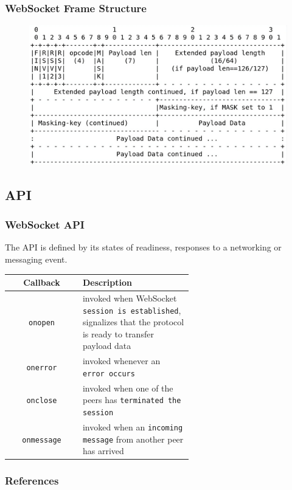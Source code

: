 \documentclass{beamer}
\begin{document}
\begin{frame}
    \frametitle{WebSocket Frame Structure}
    \begin{figure}
        \includegraphics[width=1\textwidth]{images/message_frame.png}
    \end{figure}
\end{frame}

\subsection{API}
\begin{frame}
    \frametitle{WebSocket API}
    The API is defined by its states of readiness, responses to a networking or messaging \alert{event}.
    \begin{table}
        \centering
        \begin{tabular}{|c | p{0.6\linewidth}|}
            \hline
            \textbf{Callback}  & \textbf{Description}                                                                                                    \\
            \hline
            \hline
            \texttt{onopen}    & invoked when WebSocket \texttt{session is established}, signalizes that the protocol is ready to transfer payload data \\
            \hline
            \texttt{onerror}   & invoked whenever an \texttt{error occurs}                                                                              \\
            \hline
            \texttt{onclose}   & invoked when one of the peers has \texttt{terminated the session}                                                      \\
            \hline
            \texttt{onmessage} & invoked when an \texttt{incoming message} from another peer has arrived                                                \\
            \hline
        \end{tabular}
    \end{table}
\end{frame}

\begin{frame}
    \nocite{*}
    \frametitle{References}
    
    
\end{frame}
\end{document}
